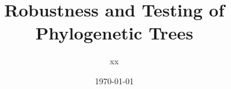 \documentclass[a4paper,10pt]{article}
\title{Robustness and Testing of Phylogenetic Trees}
\author{xx}
\begin{document}

\date{\today}
\maketitle

\begin{abstract}

\end{abstract}

\tableofcontents











\end{document}
